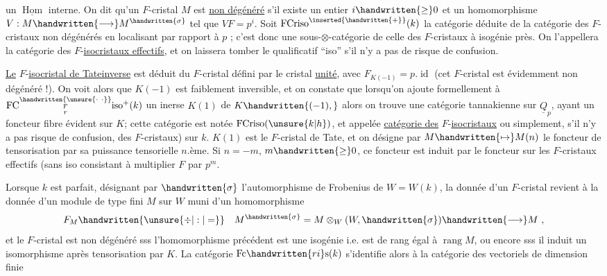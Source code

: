 un $\underline{\operatorname{Hom}}$ interne. On dit qu'un $F$-cristal $M$ est \uline{non dégénéré} s'il existe un entier $i\handwritten{\geq}0$ et un homomorphisme $V:M\handwritten{\longrightarrow}M^{\handwritten{\sigma}}$ tel que $VF=p^i$. Soit $\operatorname{FCriso}^{\inserted{\handwritten{+}}}(k)$ la catégorie  déduite de la catégorie des  $F$-cristaux non dégénérés en localisant par rapport à $p$ ; c'est donc une sous-$\otimes$-catégorie de celle des $F$-cristaux à isogénie près. On l'appellera la catégorie des $F$-\uline{isocristaux effectifs}, et on laissera tomber le qualificatif ``iso'' s'il n'y a pas de risque de confusion.

\uline{Le} $F$-\uline{isocristal de Tate\inserted{\handwritten{\ }}inverse} est déduit du $F$\handwritten{\unsure{(}}-cristal défini par le cristal \uline{unité}, avec $F_{K(-1)}=p.\operatorname{id}$ (cet $F$-cristal est évidemment non dégénéré !). On voit alors que $K(-1)$ est faiblement inversible, et on constate que lorsqu'on ajoute formellement à $\mathrm{FC}\overset{\handwritten{\unsure{\cdot\ \cdot}}}{\underset{r}{r}}\mathrm{iso}^{+}(k)$  un inerse $K(1)$ de $K\handwritten{(-1),}$ alors on trouve une catégorie tannakienne sur $\underline{Q}_p$, ayant un foncteur fibre évident sur $K$; cette catégorie est notée $\operatorname{FCriso}(\unsure{k|h})$, et appelée \uline{catégorie des} $F$-\uline{isocristaux} \handwritten{(}ou simplement, s'il n'y  a pas risque de confusion, des $F$-cristaux) sur $k$. $K(1)$ est le $F$\handwritten{(}-cristal de Tate, et on désigne par $M\handwritten{\mapsto}M(n)$ le foncteur de tensorisation par sa puissance tensorielle $n$.ème. Si $n=-m$, $m\handwritten{\geq}0$, ce foncteur est induit par le foncteur sur les $F$-cristaux effectifs (sans iso\unsure{)} consistant à multiplier $F$ par $p^m$.

 Lorsque $k$ est parfait, désignant par $\handwritten{\sigma}$ l'automorphisme de Frobenius de $W=W(k)$, la donnée d'un $F$-cristal revient à la donnée d'un module de type fini $M$ sur $W$ muni d'un homomorphisme
\[
F_M\handwritten{\unsure{\div|:|=}}\quad M^{\handwritten{\sigma}}=M\otimes_W(W,\handwritten{\sigma})\handwritten{\longrightarrow}M\ ,
\]
et le $F$\handwritten{(}-cristal est non dégénéré sss l'homomorphisme précédent est une isogénie i.e. est de rang égal à $\operatorname{rang}M$, ou encore sss il induit un isomorphisme après tensorisation par $K$. La catégorie  $\mathrm{Fc}\handwritten{ri}\mathrm{s}(k)$ s'identifie alors à la catégorie des vectoriels de dimension finie
